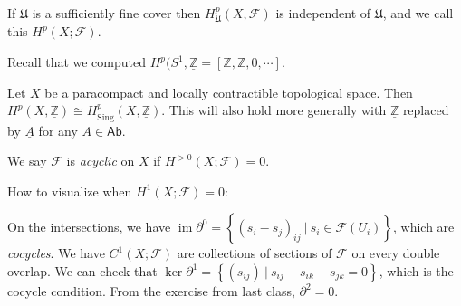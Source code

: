 \begin{fact}

If \(\mathfrak{U}\) is a sufficiently fine cover then
\(H^p_{\mathfrak{U}}(X, \mathcal{F})\) is independent of
\(\mathfrak{U}\), and we call this \(H^p(X; \mathcal{F})\).

\end{fact}

\begin{remark}

Recall that we computed
\(H^p(S^1, \underline{{\mathbb{Z}}} = [{\mathbb{Z}}, {\mathbb{Z}}, 0, \cdots]\).

\end{remark}

\begin{theorem}[?]

Let \(X\) be a paracompact and locally contractible topological space.
Then
\(H^p(X, \underline{{\mathbb{Z}}}) \cong H^p_{{\operatorname{Sing}}}(X, \underline{{\mathbb{Z}}})\).
This will also hold more generally with \(\underline{{\mathbb{Z}}}\)
replaced by \(\underline{A}\) for any \(A\in {\mathsf{Ab}}\).

\end{theorem}

\begin{definition}

We say \(\mathcal{F}\) is \emph{acyclic} on \(X\) if
\(H^{> 0 }(X; \mathcal{F}) = 0\).

\end{definition}

\begin{remark}

How to visualize when \(H^1(X; \mathcal{F}) = 0\):

\begin{figure}
\centering
{}
\end{figure}

On the intersections, we have
\(\operatorname{im}{{\partial}}^0 = \left\{{ (s_{i} - s_{j})_{ij} {~\mathrel{\Big|}~}s_i \in \mathcal{F}(U_i)}\right\}\),
which are \emph{cocycles}. We have \(C^1(X; \mathcal{F})\) are
collections of sections of \(\mathcal{F}\) on every double overlap. We
can check that
\(\ker {{\partial}}^1 = \left\{{ (s_{ij}) {~\mathrel{\Big|}~}s_{ij} - s_{ik} + s_{jk} = 0}\right\}\),
which is the cocycle condition. From the exercise from last class,
\({{\partial}}^2 = 0\).

\end{remark}

